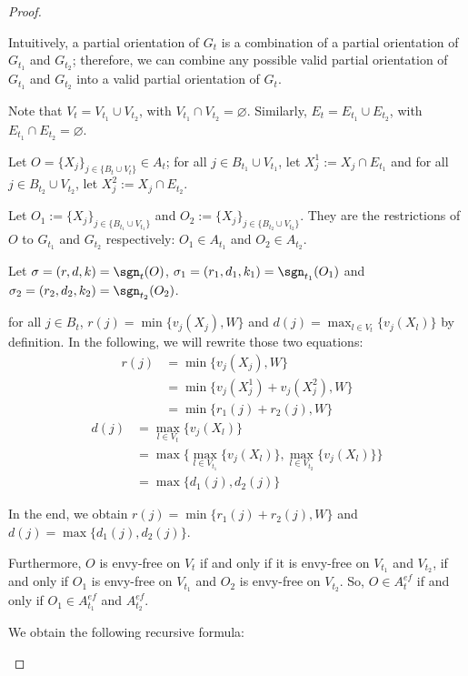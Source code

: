 \documentclass[11pt,letterpaper]{article}
\begin{document}
\begin{proof}
\begin{lemma}
    \end{lemma}

    Intuitively, a partial orientation of $G_t$ is a combination of a partial orientation of $G_{t_1}$ and $G_{t_2}$; therefore, we can combine any possible valid partial orientation of $G_{t_1}$ and $G_{t_2}$ into a valid partial orientation of $G_t$.
    \begin{nestedproof}
    Note that $V_t=V_{t_1}\cup V_{t_2}$, with $V_{t_1}\cap V_{t_2}=\varnothing$. Similarly, $E_t=E_{t_1}\cup E_{t_2}$, with $E_{t_1}\cap E_{t_2}=\varnothing$.

    Let $O=\{X_j\}_{j\in\{B_t\cup V_t\}}\in A_t$; for all $j\in B_{t_1}\cup V_{t_1}$, let $X_j^1:=X_j\cap E_{t_1}$ and
    for all $j\in B_{t_2}\cup V_{t_2}$, let $X_j^2:=X_j\cap E_{t_2}$.

    Let $O_1:=\{X_j\}_{j\in\{B_{t_1}\cup V_{t_1}\}} $ and $O_2:=\{X_j\}_{j\in\{B_{t_2}\cup V_{t_2}\}}$. They are the restrictions of $O$ to $G_{t_1}$ and $G_{t_2}$ respectively: $O_1\in A_{t_1}$ and $O_2\in A_{t_2}$.

    Let $\sigma=(r,d,k)=\sgn_t(O)$, $\sigma_1=(r_1,d_1,k_1)=\sgn_{t_1}(O_1)$ and $\sigma_2=(r_2,d_2,k_2)=\sgn_{t_2}(O_2)$.

    for all $j\in B_t$, $r(j)=\min\{v_j(X_j),W\}$ and $d(j)=\max_{l\in V_t}\{v_j(X_l)\}$ by definition. In the following, we will rewrite those two equations:
    \begin{align*}
        r(j) & = \min\{v_j(X_j),W\}\\ &=\min \{v_j(X_j^1)+v_j(X_j^2),W\}\\ &=\min\{r_1(j)+r_2(j),W\}
    \end{align*}
    \begin{align*}
        d(j)&=\max_{l\in V_t}\{v_j(X_l)\}\\&=\max\{\max_{l\in V_{t_1}}\{v_j(X_l)\},\max_{l\in V_{t_2}}\{v_j(X_l)\}\}\\&=\max\{d_1(j),d_2(j)\}
    \end{align*}

    In the end, we obtain $r(j)=\min\{r_1(j)+r_2(j),W\}$ and $d(j)=\max\{d_1(j),d_2(j)\}$.

    Furthermore, $O$ is envy-free on $V_t$ if and only if it is envy-free on $V_{t_1}$ and $V_{t_2}$, if and only if $O_1$ is envy-free on $V_{t_1}$ and $O_2$ is envy-free on $V_{t_2}$. So, $O\in A_t^{ef}$ if and only if $O_1\in A_{t_1}^{ef}$ and $A_{t_2}^{ef}$.

    We obtain the following recursive formula:



\end{nestedproof}
\end{proof}
\end{document}
